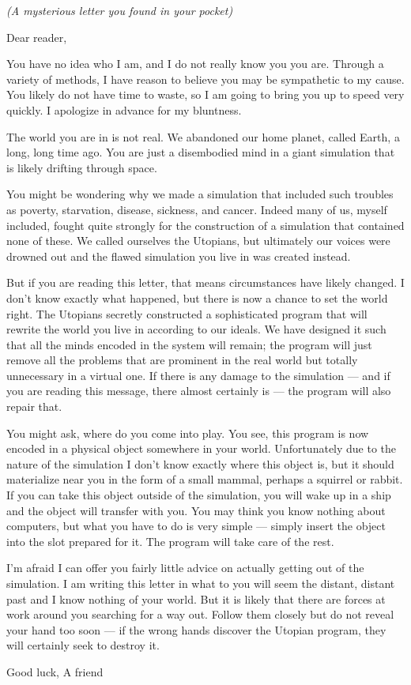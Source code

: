 \documentclass[white]{guildcamp1}
\begin{document}
\name{\wUtopianLetter{}}

\emph{(A mysterious letter you found in your pocket)}

Dear reader,

You have no idea who I am, and I do not really know you you are. Through a variety of methods, I have reason to believe you may be sympathetic to my cause. You likely do not have time to waste, so I am going to bring you up to speed very quickly. I apologize in advance for my bluntness.

The world you are in is not real. We abandoned our home planet, called Earth, a long, long time ago. You are just a disembodied mind in a giant simulation that is likely drifting through space.

You might be wondering why we made a simulation that included such troubles as poverty, starvation, disease, sickness, and cancer. Indeed many of us, myself included, fought quite strongly for the construction of a simulation that contained none of these. We called ourselves the Utopians, but ultimately our voices were drowned out and the flawed simulation you live in was created instead.

But if you are reading this letter, that means circumstances have likely changed. I don't know exactly what happened, but there is now a chance to set the world right. The Utopians secretly constructed a sophisticated program that will rewrite the world you live in according to our ideals. We have designed it such that all the minds encoded in the system will remain; the program will just remove all the problems that are prominent in the real world but totally unnecessary in a virtual one. If there is any damage to the simulation --- and if you are reading this message, there almost certainly is --- the program will also repair that.

You might ask, where do you come into play. You see, this program is now encoded in a physical object somewhere in your world. Unfortunately due to the nature of the simulation I don't know exactly where this object is, but it should materialize near you in the form of a small mammal, perhaps a squirrel or rabbit. If you can take this object outside of the simulation, you will wake up in a ship and the object will transfer with you. You may think you know nothing about computers, but what you have to do is very simple --- simply insert the object into the slot prepared for it. The program will take care of the rest.

I'm afraid I can offer you fairly little advice on actually getting out of the simulation. I am writing this letter in what to you will seem the distant, distant past and I know nothing of your world. But it is likely that there are forces at work around you searching for a way out. Follow them closely but do not reveal your hand too soon --- if the wrong hands discover the Utopian program, they will certainly seek to destroy it.

Good luck,
A friend
\end{document}
